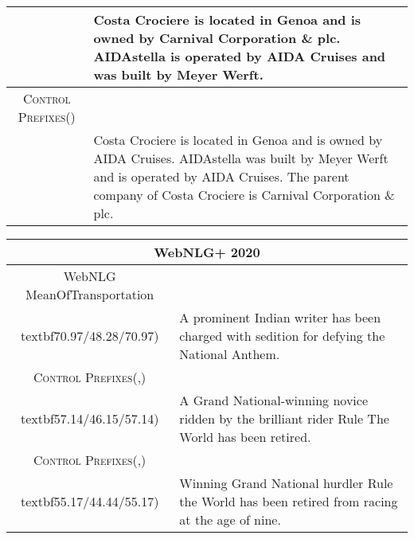 \documentclass[11pt]{article}
\newcommand{\control}{\textsc{Control Prefixes}\xspace}
\newcommand{\bartl}{BART}
\newcommand{\bl}[1]{{\color{blue}  #1}}
\newcommand{\rd}[1]{{\color{red}  #1}}
\begin{document}
\begin{table*}[bth!]
\begin{tabular}{c|p{}}
& Costa Crociere is located in Genoa and is owned by Carnival Corporation \& plc. AIDAstella is operated by AIDA Cruises and was built by Meyer Werft. \\\hline
\control () \\& Costa Crociere is located in Genoa and is owned by AIDA Cruises. AIDAstella was built by Meyer Werft and is operated by AIDA Cruises. The parent company of Costa Crociere is Carnival Corporation \& plc.
\\ \midrule 
\hline




  \end{tabular}
  \caption{\textbf{WebNLG example generations:} sources are shown in their linearized form, as fed to the T5-large based models, with prefix-tuning output and one of the gold references shown for comparison with \control output. Triplesets are from WebNLG unseen categories and the zero-shot procedure is depicted using the textual category labels. As an example, for the unseen category \emph{Athlete}, the closest Glove embedding belonging to a \emph{seen} category label in embedding space is \rd{SportsTeam}. Therefore the trained control prefix relating to \emph{SportsTeam} is used for this example at inference time.}
  \label{tab:app_web_qual}
\end{table*}




\begin{table*}[bth!]
\scriptsize
  \centering
  \renewcommand{\arraystretch}{1.1}
  \begin{tabular}{c|p{}}
  \hline
 
  \multicolumn{2}{c}{\textbf{WebNLG+ 2020}} \\ \hline
\bl{WebNLG} \rd{MeanOfTransportation}\\textbf{70.97/48.28/70.97})
  
& A prominent Indian writer has been charged with sedition for defying the National Anthem.  \\ \hline
\control (,)\\textbf{57.14/46.15/57.14})

& A Grand National-winning novice ridden by the brilliant rider Rule The World has been retired.  \\ \hline
\control (,) \\textbf{{55.17/44.44/55.17}})
&Winning Grand National hurdler Rule the World has been retired from racing at the age of nine. \\ \midrule \hline
  \end{tabular}
  \caption{\textbf{XSum generated summaries} for T5-large fine-tuned and \control based on \bartl. These are presented alongside the source document and the sole gold reference. Source documents are truncated to 300 words if necessary. \textbf{ROUGE-1/ROUGE-2/ROUGE-L} are reported in bold. The \bl{news/sport} control prefix and the related \rd{sub-directory} control prefix are highlighted.}
  \label{tab:app_qualitative_1}
\end{table*}




 
\end{document}
